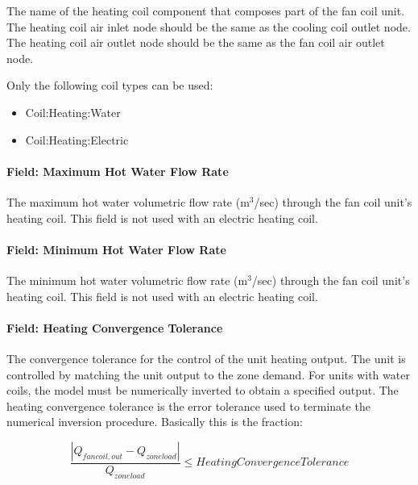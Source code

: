 The name of the heating coil component that composes part of the fan coil unit. The heating coil air inlet node should be the same as the cooling coil outlet node. The heating coil air outlet node should be the same as the fan coil air outlet node.

Only the following coil types can be used:

\begin{itemize}
\item
  Coil:Heating:Water
\item
  Coil:Heating:Electric
\end{itemize}

\paragraph{Field: Maximum Hot Water Flow Rate}\label{field-maximum-hot-water-flow-rate-000}

The maximum hot water volumetric flow rate (m\(^{3}\)/sec) through the fan coil unit's heating coil. This field is not used with an electric heating coil.

\paragraph{Field: Minimum Hot Water Flow Rate}\label{field-minimum-hot-water-flow-rate-000}

The minimum hot water volumetric flow rate (m\(^{3}\)/sec) through the fan coil unit's heating coil. This field is not used with an electric heating coil.

\paragraph{Field: Heating Convergence Tolerance}\label{field-heating-convergence-tolerance-000}

The convergence tolerance for the control of the unit heating output. The unit is controlled by matching the unit output to the zone demand. For units with water coils, the model must be numerically inverted to obtain a specified output. The heating convergence tolerance is the error tolerance used to terminate the numerical inversion procedure. Basically this is the fraction:

\begin{equation}
\frac{{\left| {{Q_{fancoil,out}} - {Q_{zoneload}}} \right|}}{{{Q_{zoneload}}}} \le HeatingConvergenceTolerance
\end{equation}

